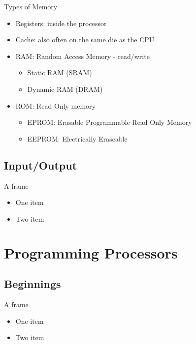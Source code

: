 \documentclass{beamer}
\begin{document}
\begin{frame}{Types of Memory}
  \begin{itemize}
  \item
    Registers: inside the processor
  \item
    Cache: also often on the same die as the CPU
  \item
    RAM: Random Access Memory - read/write
    \begin{itemize}
    \item
      Static RAM (SRAM)
    \item
      Dynamic RAM (DRAM)
    \end{itemize}
  \item
    ROM: Read Only memory
    \begin{itemize}
    \item
      EPROM: Erasable Programmable Read Only Memory
    \item
      EEPROM: Electrically Eraseable
    \end{itemize}
  \end{itemize}
\end{frame}

\subsection[IO]{Input/Output}

\begin{frame}{A frame}
  \begin{itemize}
  \item
    One item
  \item
    Two item
  \end{itemize}
\end{frame}

\section{Programming Processors}

\subsection[Older]{Beginnings}

\begin{frame}{A frame}
  \begin{itemize}
  \item
    One item
  \item
    Two item
  \end{itemize}
\end{frame}
\end{document}
